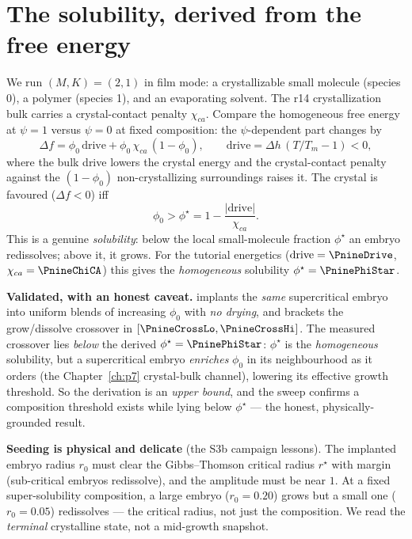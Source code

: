 \section{The solubility, derived from the free energy}

We run $(M,K)=(2,1)$ in film mode: a crystallizable small molecule
(species 0), a polymer (species 1), and an evaporating solvent. The r14
crystallization bulk carries a crystal-contact penalty $\chi_{ca}$. Compare
the homogeneous free energy at $\psi=1$ versus $\psi=0$ at fixed
composition: the $\psi$-dependent part changes by
%
\begin{equation}
  \Delta f = \phi_0\,\text{drive} + \phi_0\,\chi_{ca}\,(1-\phi_0),
  \qquad \text{drive}=\Delta h\,(T/T_m-1)<0,
\end{equation}
%
where the bulk drive lowers the crystal energy and the crystal-contact
penalty against the $(1-\phi_0)$ non-crystallizing surroundings raises it.
The crystal is favoured ($\Delta f<0$) iff
%
\begin{equation}
  \phi_0 > \phi^\star = 1 - \frac{|\text{drive}|}{\chi_{ca}}.
\end{equation}
%
This is a genuine \emph{solubility}: below the local small-molecule
fraction $\phi^\star$ an embryo redissolves; above it, it grows. For the
tutorial energetics ($\text{drive}=\ensuremath{\PnineDrive}$,
$\chi_{ca}=\ensuremath{\PnineChiCA}$) this gives the \emph{homogeneous}
solubility $\phi^\star=\ensuremath{\PninePhiStar}$.

\begin{keybox}
\textbf{Validated, with an honest caveat.} 
implants the \emph{same} supercritical embryo into uniform blends of
increasing $\phi_0$ with \emph{no drying}, and brackets the grow/dissolve
crossover in
$[\ensuremath{\PnineCrossLo},\ensuremath{\PnineCrossHi}]$. The measured
crossover lies \emph{below} the derived $\phi^\star=\ensuremath{\PninePhiStar}$:
$\phi^\star$ is the \emph{homogeneous} solubility, but a supercritical
embryo \emph{enriches} $\phi_0$ in its neighbourhood as it orders (the
Chapter~\ref{ch:p7} crystal-bulk channel), lowering its effective growth
threshold. So the derivation is an \emph{upper bound}, and the sweep
confirms a composition threshold exists while lying below $\phi^\star$ ---
the honest, physically-grounded result.
\end{keybox}

\begin{keybox}
\textbf{Seeding is physical and delicate} (the S3b campaign lessons). The
implanted embryo radius $r_0$ must clear the Gibbs--Thomson critical radius
$r^\star$ with margin (sub-critical embryos redissolve), and the amplitude
must be near $1$. At a fixed super-solubility composition, a large embryo
($r_0=0.20$) grows but a small one ($r_0=0.05$) redissolves --- the
critical radius, not just the composition. We read the \emph{terminal}
crystalline state, not a mid-growth snapshot.
\end{keybox}

